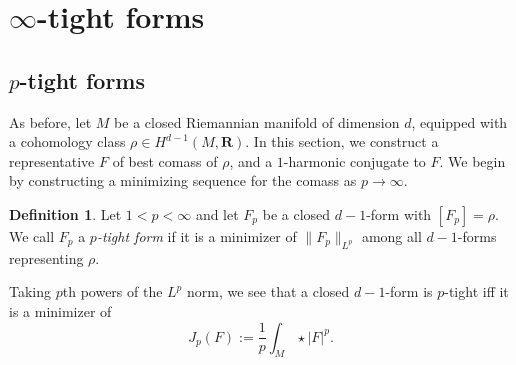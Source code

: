 \documentclass[reqno,11pt]{amsart}
\newcommand{\RR}{\mathbf{R}}
\newcommand{\dfn}[1]{\emph{#1}\index{#1}}
\theoremstyle{definition}
\newtheorem{definition}[theorem]{Definition}
\numberwithin{equation}{section}
\begin{document}
\section{\texorpdfstring{$\infty$-tight forms}{Infinity-tight forms}}\label{tight forms sec}
\subsection{\texorpdfstring{$p$-tight forms}{p-tight forms}}
As before, let $M$ be a closed Riemannian manifold of dimension $d$, equipped with a cohomology class $\rho \in H^{d - 1}(M, \RR)$.
In this section, we construct a representative $F$ of best comass of $\rho$, and a $1$-harmonic conjugate to $F$.
We begin by constructing a minimizing sequence for the comass as $p \to \infty$.

\begin{definition}
Let $1 < p < \infty$ and let $F_p$ be a closed $d - 1$-form with $[F_p] = \rho$.
We call $F_p$ a \dfn{$p$-tight form} if it is a minimizer of $\|F_p\|_{L^p}$ among all $d - 1$-forms representing $\rho$.
\end{definition}

Taking $p$th powers of the $L^p$ norm, we see that a closed $d - 1$-form is $p$-tight iff it is a minimizer of
$$J_p(F) := \frac{1}{p} \int_M \star |F|^p.$$
\end{document}
